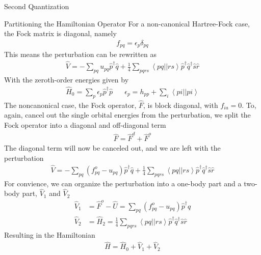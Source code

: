\documentclass[twoside,english]{uiofysmaster}
\begin{document}
\begin{chapter}{Second Quantization}
\begin{section}{Partitioning the Hamiltonian Operator}
		For a non-canonical Hartree-Fock case, the Fock matrix is diagonal, namely
		\begin{align}
			f_{pq} = \epsilon_p \delta_{pq}
		\end{align}
		This means the perturbation can be rewritten as
		\begin{align}
			\hat V = -\sum_{pq} u_{pq} \hat p^\dagger \hat q + \frac{1}{4} \sum_{pqrs} \left<pq||rs\right> \hat p^\dagger \hat q^\dagger \hat s \hat r	
			\label{3.95}
		\end{align}
		With the zeroth-order energies given by 
		\begin{align}
			\hat H_0 = \sum_p \epsilon_p \hat p^\dagger \hat p \;\;\;\;\;\; \epsilon_p = h_{pp} + \sum_i \left<pi||pi\right>
		\end{align}
		The noncanonical case, the Fock operator, $\hat F$, is block diagonal, with $f_{ia} = 0$. To, again, cancel out the single orbital energies from the perturbation, we split the Fock operator into a diagonal and off-diagonal term
		\begin{align}
			\hat F = \hat F^d + \hat F^o
		\end{align}
		The diagonal term will now be canceled out, and we are left with the perturbation
		\begin{align}
			\hat V = -\sum_{pq} (f_{pq}^o - u_{pq}) \hat p^\dagger \hat q + \frac{1}{4} \sum_{pqrs} \left<pq||rs\right> \hat p^\dagger \hat q^\dagger \hat s \hat r
		\end{align}
		For convience, we can organize the perturbation into a one-body part and a two-body part, $\hat V_1$ and $\hat V_2$
		\begin{align}
			\hat V_1 &= \hat F^o - \hat U = \sum_{pq} (f_{pq}^o - u_{pq}) \hat p^\dagger \hat q \\
			\hat V_2 &= \hat H_2 = \frac{1}{4} \sum_{pqrs} \left< pq||rs\right> \hat p^\dagger \hat q^\dagger \hat s \hat r
			\label{Partitioned Hamiltonian}
		\end{align}
		Resulting in the Hamiltonian
		\begin{align}
			\hat H = \hat H_0 + \hat V_1 + \hat V_2
		\end{align}

	\end{section}


\end{chapter}
\end{document}
